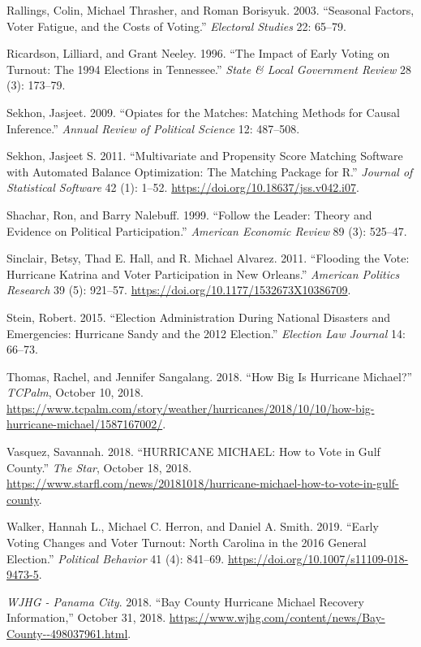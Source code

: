 \documentclass[
  12pt,
]{article}
\newlength{\cslhangindent}
\newenvironment{cslreferences}%
  {\setlength{\parindent}{0pt}%
  \everypar{\setlength{\hangindent}{\cslhangindent}}\ignorespaces}%
  {\par}
\begin{document}
\begin{cslreferences}
\leavevmode\hypertarget{ref-Rallings2003}{}%
Rallings, Colin, Michael Thrasher, and Roman Borisyuk. 2003. ``Seasonal Factors, Voter Fatigue, and the Costs of Voting.'' \emph{Electoral Studies} 22: 65--79.

\leavevmode\hypertarget{ref-Ricardson1996}{}%
Ricardson, Lilliard, and Grant Neeley. 1996. ``The Impact of Early Voting on Turnout: The 1994 Elections in Tennessee.'' \emph{State \& Local Government Review} 28 (3): 173--79.

\leavevmode\hypertarget{ref-Sekhon2009}{}%
Sekhon, Jasjeet. 2009. ``Opiates for the Matches: Matching Methods for Causal Inference.'' \emph{Annual Review of Political Science} 12: 487--508.

\leavevmode\hypertarget{ref-Sekhon2011}{}%
Sekhon, Jasjeet S. 2011. ``Multivariate and Propensity Score Matching Software with Automated Balance Optimization: The Matching Package for R.'' \emph{Journal of Statistical Software} 42 (1): 1--52. \url{https://doi.org/10.18637/jss.v042.i07}.

\leavevmode\hypertarget{ref-Shachar1999}{}%
Shachar, Ron, and Barry Nalebuff. 1999. ``Follow the Leader: Theory and Evidence on Political Participation.'' \emph{American Economic Review} 89 (3): 525--47.

\leavevmode\hypertarget{ref-Sinclair2011}{}%
Sinclair, Betsy, Thad E. Hall, and R. Michael Alvarez. 2011. ``Flooding the Vote: Hurricane Katrina and Voter Participation in New Orleans.'' \emph{American Politics Research} 39 (5): 921--57. \url{https://doi.org/10.1177/1532673X10386709}.

\leavevmode\hypertarget{ref-Stein2015}{}%
Stein, Robert. 2015. ``Election Administration During National Disasters and Emergencies: Hurricane Sandy and the 2012 Election.'' \emph{Election Law Journal} 14: 66--73.

\leavevmode\hypertarget{ref-Thomas2018}{}%
Thomas, Rachel, and Jennifer Sangalang. 2018. ``How Big Is Hurricane Michael?'' \emph{TCPalm}, October 10, 2018. \url{https://www.tcpalm.com/story/weather/hurricanes/2018/10/10/how-big-hurricane-michael/1587167002/}.

\leavevmode\hypertarget{ref-Vasquez2018}{}%
Vasquez, Savannah. 2018. ``HURRICANE MICHAEL: How to Vote in Gulf County.'' \emph{The Star}, October 18, 2018. \url{https://www.starfl.com/news/20181018/hurricane-michael-how-to-vote-in-gulf-county}.

\leavevmode\hypertarget{ref-Walker2019}{}%
Walker, Hannah L., Michael C. Herron, and Daniel A. Smith. 2019. ``Early Voting Changes and Voter Turnout: North Carolina in the 2016 General Election.'' \emph{Political Behavior} 41 (4): 841--69. \url{https://doi.org/10.1007/s11109-018-9473-5}.

\leavevmode\hypertarget{ref-WJHG2018}{}%
\emph{WJHG - Panama City}. 2018. ``Bay County Hurricane Michael Recovery Information,'' October 31, 2018. \url{https://www.wjhg.com/content/news/Bay-County--498037961.html}.
\end{cslreferences}
\end{document}
